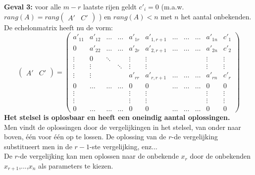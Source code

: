 \begin{ftonthoud}
	{\bf Geval 3:} voor alle $m-r$ laatste rijen geldt $c'_{i}=0$ (m.a.w. $rang(A) = rang \left( \begin{array}{c|c} A' & C' \end{array} \right)$ ) en $rang(A)<n$ met $n$ het aantal onbekenden. \\
	De echelonmatrix heeft nu de vorm:
	\[
	\left( \begin{array}{c|c} A' & C' \end{array} \right) = 
	\left(
	\begin{array}{cccccccccc|c}
	a'_{11} & a'_{12} & \ldots & \ldots & a'_{1r} & a'_{1,r+1} & \ldots & \ldots & \ldots & a'_{1n} & c'_{1} \\
	0 & a'_{22} & \ldots & \ldots & a'_{2r} & a'_{2,r+1} & \ldots & \ldots & \ldots & a'_{2n} & c'_{2} \\
	\vdots & 0 & \ddots &  & \vdots & \vdots & & & & \vdots & \vdots \\
	\vdots & \vdots & & \ddots & \vdots & \vdots & & & & \vdots & \vdots \\
	\vdots & \vdots & & & a'_{rr} & a'_{r,r+1} & \ldots & \ldots & \ldots & a'_{rn} & c'_{r} \\
	0 & \ldots & \ldots & \ldots & 0 & 0 & \ldots & \ldots & \ldots & 0 & 0 \\
	\vdots & & & & \vdots & \vdots & & & & \vdots & \vdots \\
	\vdots & & & & \vdots & \vdots & & & & \vdots & \vdots \\
	0 & \ldots & \ldots & \ldots & 0 & 0 & \ldots & \ldots & \ldots & 0 & 0 
	\end{array} \right)
	\]
	{\bf Het stelsel is oplosbaar en heeft een oneindig aantal oplossingen.} \\
	Men vindt de oplossingen door de vergelijkingen in het stelsel, van onder naar boven, \'{e}\'{e}n voor \'{e}\'{e}n op te lossen. De oplossing van de $r$-de vergelijking substitueert men in de $r-1$-ste  vergelijking, enz... \\
	De $r$-de vergelijking kan men oplossen naar de onbekende $x_{r}$ door de onbekenden $x_{r+1}$,...,$x_{n}$ als parameters te kiezen. 
\end{ftonthoud}	

